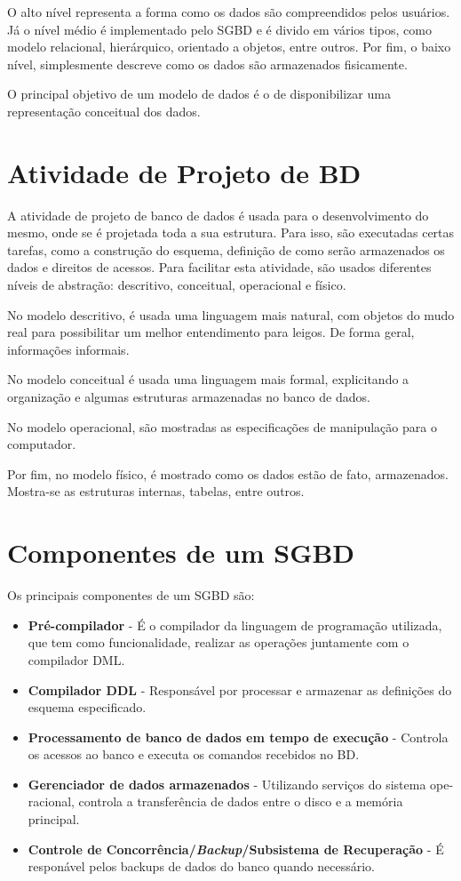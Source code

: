 \documentclass[12pt]{article}
\begin{document}
O alto nível representa a forma como os dados são compreendidos pelos usuários. Já o nível médio é implementado pelo SGBD e é divido em vários tipos, como modelo relacional, hierárquico, orientado a objetos, entre outros. Por fim, o baixo nível, simplesmente descreve como os dados são armazenados fisicamente.

O principal objetivo de um modelo de dados é o de disponibilizar uma representação conceitual dos dados.

\section{Atividade de Projeto de BD}
A atividade de projeto de banco de dados é usada para o desenvolvimento do mesmo, onde se é projetada toda a sua estrutura. Para isso, são executadas certas tarefas, como a construção do esquema, definição de como serão armazenados os dados e direitos de acessos.
Para facilitar esta atividade, são usados diferentes níveis de abstração: descritivo, conceitual, operacional e físico.

No modelo descritivo, é usada uma linguagem mais natural, com objetos do mudo real para possibilitar um melhor entendimento para leigos. De forma geral, informações informais.

No modelo conceitual é usada uma linguagem mais formal, explicitando a organização e algumas estruturas armazenadas no banco de dados.

No modelo operacional, são mostradas as especificações de manipulação para o computador. 

Por fim, no modelo físico, é mostrado como os dados estão de fato, armazenados. Mostra-se as estruturas internas, tabelas, entre outros.

\section{Componentes de um SGBD}
Os principais componentes de um SGBD são:
\begin{itemize}
\item \textbf{Pré-compilador} - É o compilador da linguagem de programação utilizada, que tem como funcionalidade, realizar as operações juntamente com o compilador DML.
\item \textbf{Compilador DDL} - Responsável por processar e armazenar as definições do esquema especificado.
\item \textbf{Processamento de banco de dados em tempo de execução} - Controla os acessos ao banco e executa os comandos recebidos no BD.
\item \textbf{Gerenciador de dados armazenados} - Utilizando serviços do sistema ope-racional, controla a transferência de dados entre o disco e a memória principal.
\item \textbf{Controle de Concorrência/\textit{Backup}/Subsistema de Recuperação} - É responável pelos backups de dados do banco quando necessário.
\end{itemize}
\end{document}
